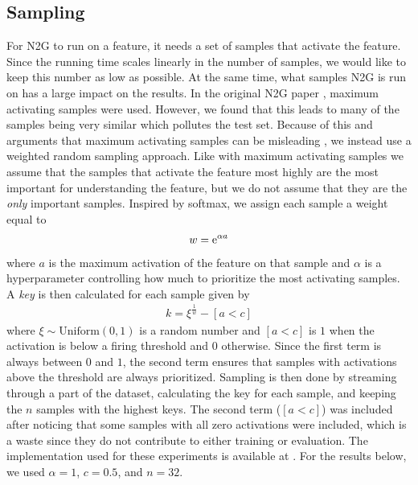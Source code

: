 \subsection{Sampling}
For N2G to run on a feature, it needs a set of samples that activate the feature.
Since the running time scales linearly in the number of samples, we would like to keep this number as low as possible.
At the same time, what samples N2G is run on has a large impact on the results.
In the original N2G paper , maximum activating samples were used.
However, we found that this leads to many of the samples being very similar which pollutes the test set.
Because of this and arguments that maximum activating samples can be misleading , we instead use a weighted random sampling approach.
Like with maximum activating samples we assume that the samples that activate the feature most highly are the most important for understanding the feature, but we do not assume that they are the \emph{only} important samples.
Inspired by softmax, we assign each sample a weight equal to
\begin{align*}
    w=\mathrm{e}^{\alpha a}
\end{align*}
where $a$ is the maximum activation of the feature on that sample and $\alpha$ is a hyperparameter controlling how much to prioritize the most activating samples.
A \emph{key} is then calculated for each sample given by
\begin{align*}
    k=\xi^{\frac1w}-[a<c]
\end{align*}
where $\xi\sim\mathrm{Uniform}(0,1)$ is a random number and $[a<c]$ is $1$ when the activation is below a firing threshold and $0$ otherwise.
Since the first term is always between $0$ and $1$, the second term ensures that samples with activations above the threshold are always prioritized.
Sampling is then done by streaming through a part of the dataset, calculating the key for each sample, and keeping the $n$ samples with the highest keys.
The second term ($[a<c]$) was included after noticing that some samples with all zero activations were included, which is a waste since they do not contribute to either training or evaluation.
The implementation used for these experiments is available at .
For the results below, we used $\alpha=1$, $c=0.5$, and $n=32$.

